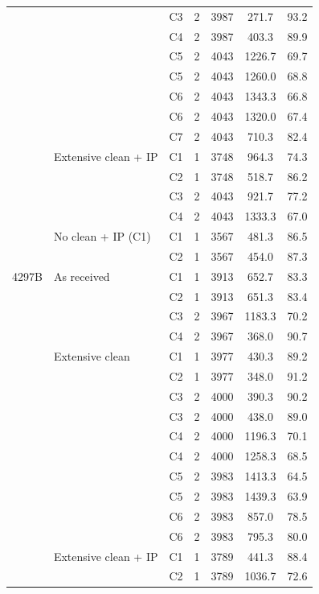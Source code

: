 {\begin{longtable}{lllcccc}
   &  & C3 & 2 & 3987 & 271.7 & 93.2 \\
   &  & C4 & 2 & 3987 & 403.3 & 89.9 \\
   &  & C5 & 2 & 4043 & 1226.7 & 69.7 \\
   &  & C5 & 2 & 4043 & 1260.0 & 68.8 \\
   &  & C6 & 2 & 4043 & 1343.3 & 66.8 \\
   &  & C6 & 2 & 4043 & 1320.0 & 67.4 \\
   &  & C7 & 2 & 4043 & 710.3 & 82.4 \\
  \addlinespace
   & Extensive clean + IP & C1 & 1 & 3748 & 964.3 & 74.3 \\
   &  & C2 & 1 & 3748 & 518.7 & 86.2 \\
   &  & C3 & 2 & 4043 & 921.7 & 77.2 \\
   &  & C4 & 2 & 4043 & 1333.3 & 67.0 \\
  \addlinespace
   & No clean + IP (C1) & C1 & 1 & 3567 & 481.3 & 86.5 \\
   &  & C2 & 1 & 3567 & 454.0 & 87.3 \\
  \midrule
  4297B & As received & C1 & 1 & 3913 & 652.7 & 83.3 \\
   &  & C2 & 1 & 3913 & 651.3 & 83.4 \\
   &  & C3 & 2 & 3967 & 1183.3 & 70.2 \\
   &  & C4 & 2 & 3967 & 368.0 & 90.7 \\
  \addlinespace
   & Extensive clean & C1 & 1 & 3977 & 430.3 & 89.2 \\
   &  & C2 & 1 & 3977 & 348.0 & 91.2 \\
   &  & C3 & 2 & 4000 & 390.3 & 90.2 \\
   &  & C3 & 2 & 4000 & 438.0 & 89.0 \\
   &  & C4 & 2 & 4000 & 1196.3 & 70.1 \\
   &  & C4 & 2 & 4000 & 1258.3 & 68.5 \\
   &  & C5 & 2 & 3983 & 1413.3 & 64.5 \\
   &  & C5 & 2 & 3983 & 1439.3 & 63.9 \\
   &  & C6 & 2 & 3983 & 857.0 & 78.5 \\
   &  & C6 & 2 & 3983 & 795.3 & 80.0 \\
  \addlinespace
   & Extensive clean + IP & C1 & 1 & 3789 & 441.3 & 88.4 \\
   &  & C2 & 1 & 3789 & 1036.7 & 72.6 \\
\end{longtable}}


\clearpage
